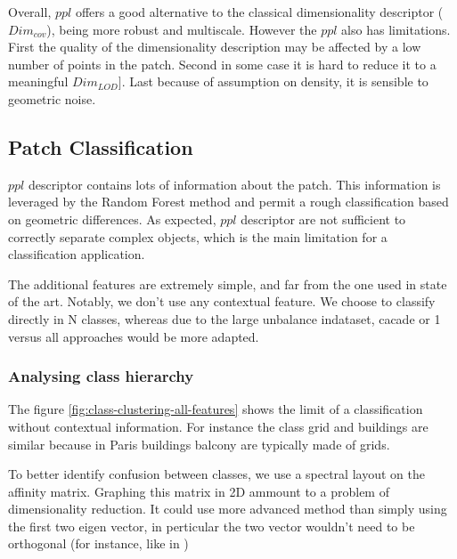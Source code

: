 		Overall, $ppl$ offers a good alternative to the classical dimensionality descriptor ($Dim_{cov}$), being more robust and multiscale. 
		However the $ppl$ also has limitations. 
		First the quality of the dimensionality description may be affected by a low number of points in the patch. 
		Second in some case it is hard to reduce it to a meaningful $Dim_{LOD}]$.
		Last because of assumption on density, it is sensible to geometric noise.
			  
	\subsection{Patch Classification}
		$ppl$ descriptor contains lots of information about the patch. This information is leveraged by the Random Forest method and permit a rough classification based on geometric differences.
		As expected, $ppl$ descriptor are  not sufficient to correctly separate complex objects,
		which is the main limitation for a classification application. 
		
		The additional features are extremely simple, and far from the one used in state of the art.
		Notably, we don't use any contextual feature.
		We choose to classify directly in N classes, whereas due to the large unbalance indataset, cacade or 1 versus all approaches would be more adapted.
		
	\subsubsection{Analysing class hierarchy} 
		The figure \ref{fig:class-clustering-all-features} shows the limit of a classification without contextual information. For instance the class grid and buildings are similar because in Paris buildings balcony are typically made of grids.
		
		To better identify confusion between classes, we use a spectral layout on the affinity matrix.
		Graphing this matrix in 2D ammount to a problem of dimensionality reduction.
		It could use more advanced method than simply using the first two eigen vector,
		in perticular the two vector wouldn't need to be orthogonal (for instance, like in \cite{Hyvarinen2000})
				 
